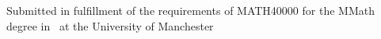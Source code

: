 \begin{titlepage}
\vfill %
Submitted in fulfillment of the requirements of MATH40000 for the MMath degree in
\degreetype~at the University of Manchester\\[0.5cm]

\makeatletter
\@date 
\makeatother


\end{titlepage}
